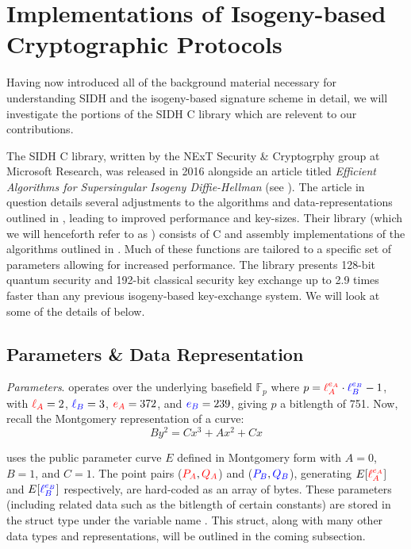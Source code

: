 \section{Implementations of Isogeny-based Cryptographic Protocols}
\label{sec:implementations}

Having now introduced all of the background material necessary for understanding SIDH and the isogeny-based signature scheme in detail, we will investigate the portions of the SIDH C library which are relevent to our contributions.

The SIDH C library, written by the NExT Security \& Cryptogrphy group at Microsoft Research, was released in 2016 alongside an article titled \emph{Efficient Algorithms for Supersingular Isogeny Diffie-Hellman} (see \cite{effalg}). The article in question details several adjustments to the algorithms and data-representations outlined in \cite{djp}, leading to improved performance and key-sizes. Their library (which we will henceforth refer to as \sidh) consists of C and assembly implementations of the algorithms outlined in \cite{effalg}. Much of these functions are tailored to a specific set of parameters allowing for increased performance. The library presents 128-bit quantum security and 192-bit classical security key exchange up to 2.9 times faster than any previous isogeny-based key-exchange system. We will look at some of the details of \sidh below.

\subsection{Parameters \& Data Representation}
\label{subsec:datarep}

\noindent
\emph{Parameters}. \sidh operates over the underlying basefield $\mathbb{F}_{p}$ where $p = \textcolor{red}{\ell_{A}^{e_A}}\cdot\textcolor{blue}{\ell_{B}^{e_B}} - 1$, with $\textcolor{red}{\ell_{A}} = 2$, $\textcolor{blue}{\ell_{B}} = 3$, $\textcolor{red}{e_A} = 372$, and $\textcolor{blue}{e_B} = 239$, giving $p$ a bitlength of 751. Now, recall the Montgomery representation of a curve:
$$
By^2 = Cx^3 + Ax^2 + Cx
$$

\sidh uses the public parameter curve $E$ defined in Montgomery form with $A = 0$, $B = 1$, and $C = 1$. The point pairs ($\textcolor{red}{P_A},\textcolor{red}{Q_A}$) and ($\textcolor{blue}{P_B}, \textcolor{blue}{Q_B}$), generating $E[\textcolor{red}{\ell_{A}^{e_A}}]$ and $E[\textcolor{blue}{\ell_{B}^{e_B}}]$ respectively, are hard-coded as an array of bytes. These parameters (including related data such as the bitlength of certain constants) are stored in the struct type  under the variable name . This struct, along with many other \sidh data types and representations, will be outlined in the coming subsection.

